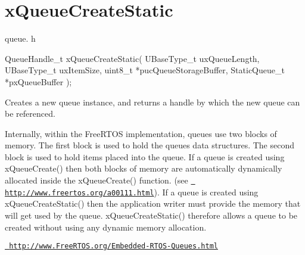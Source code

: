 \hypertarget{group__x_queue_create_static}{}\section{x\+Queue\+Create\+Static}
\label{group__x_queue_create_static}
queue. h 
\begin{DoxyPre}
QueueHandle\_t xQueueCreateStatic(
                          UBaseType\_t uxQueueLength,
                          UBaseType\_t uxItemSize,
                          uint8\_t *pucQueueStorageBuffer,
                          StaticQueue\_t *pxQueueBuffer
                      );
  \end{DoxyPre}


Creates a new queue instance, and returns a handle by which the new queue can be referenced.

Internally, within the Free\+R\+T\+OS implementation, queues use two blocks of memory. The first block is used to hold the queue\textquotesingle{}s data structures. The second block is used to hold items placed into the queue. If a queue is created using x\+Queue\+Create() then both blocks of memory are automatically dynamically allocated inside the x\+Queue\+Create() function. (see \href{http://www.freertos.org/a00111.html}{\texttt{ http\+://www.\+freertos.\+org/a00111.\+html}}). If a queue is created using x\+Queue\+Create\+Static() then the application writer must provide the memory that will get used by the queue. x\+Queue\+Create\+Static() therefore allows a queue to be created without using any dynamic memory allocation.

\href{http://www.FreeRTOS.org/Embedded-RTOS-Queues.html}{\texttt{ http\+://www.\+Free\+R\+T\+O\+S.\+org/\+Embedded-\/\+R\+T\+O\+S-\/\+Queues.\+html}}


